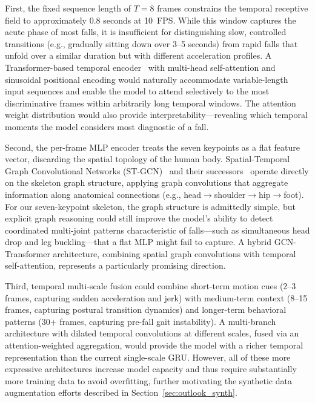First, the fixed sequence length of $T = 8$ frames constrains the temporal receptive field to approximately 0.8 seconds at 10~FPS. While this window captures the acute phase of most falls, it is insufficient for distinguishing slow, controlled transitions (e.g., gradually sitting down over 3--5 seconds) from rapid falls that unfold over a similar duration but with different acceleration profiles. A Transformer-based temporal encoder~\cite{vaswani2017attention} with multi-head self-attention and sinusoidal positional encoding would naturally accommodate variable-length input sequences and enable the model to attend selectively to the most discriminative frames within arbitrarily long temporal windows. The attention weight distribution would also provide interpretability---revealing which temporal moments the model considers most diagnostic of a fall.

Second, the per-frame MLP encoder treats the seven keypoints as a flat feature vector, discarding the spatial topology of the human body. Spatial-Temporal Graph Convolutional Networks (ST-GCN)~\cite{yan2018spatial} and their successors~\cite{shi2019two,chen2021channel} operate directly on the skeleton graph structure, applying graph convolutions that aggregate information along anatomical connections (e.g., head$\to$shoulder$\to$hip$\to$foot). For our seven-keypoint skeleton, the graph structure is admittedly simple, but explicit graph reasoning could still improve the model's ability to detect coordinated multi-joint patterns characteristic of falls---such as simultaneous head drop and leg buckling---that a flat MLP might fail to capture. A hybrid GCN-Transformer architecture, combining spatial graph convolutions with temporal self-attention, represents a particularly promising direction.

Third, temporal multi-scale fusion could combine short-term motion cues (2--3 frames, capturing sudden acceleration and jerk) with medium-term context (8--15 frames, capturing postural transition dynamics) and longer-term behavioral patterns (30+ frames, capturing pre-fall gait instability). A multi-branch architecture with dilated temporal convolutions at different scales, fused via an attention-weighted aggregation, would provide the model with a richer temporal representation than the current single-scale GRU. However, all of these more expressive architectures increase model capacity and thus require substantially more training data to avoid overfitting, further motivating the synthetic data augmentation efforts described in Section~\ref{sec:outlook_synth}.

